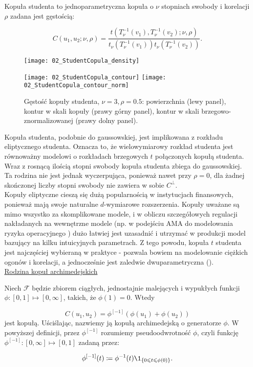 \begin{df}
	Kopuła studenta to jednoparametryczna kopuła o $\nu$ stopniach swobody i korelacji $\rho$ zadana jest gęstością:
	
	$$ C(u_1, u_2;\nu,\rho) = \frac{t(T_{\nu}^{-1}(v_1), T_{\nu}^{-1}(v_2);\nu,\rho)}{t_{\nu}(T_{\nu}^{-1}(v_1))t_{\nu}(T_{\nu}^{-1}(v_2))}.$$
\end{df}
\begin{figure}[h]
	\centering
	\begin{minipage}{0.5\linewidth}
		\texttt{[image: 02\_StudentCopula\_density]}
	\end{minipage}
	\begin{minipage}{0.45\linewidth}
		\texttt{[image: 02\_StudentCopula\_contour]}
		\texttt{[image: 02\_StudentCopula\_contour\_norm]}
	\end{minipage}
	\caption{Gęstość kopuły studenta, $\nu=3, \rho=0.5$: powierzchnia (lewy panel), kontur w skali kopuły (prawy górny panel), kontur w skali brzegowo-znormalizowanej (prawy dolny panel). \label{fig:student_copula_density}}
\end{figure}
Kopuła studenta, podobnie do gaussowskiej, jest implikowana z rozkładu eliptycznego studenta. Oznacza to, że wielowymiarowy rozkład studenta jest równoważny modelowi o rozkładach brzegowych $t$ połączonych kopułą studenta. Wraz z rosnącą ilością stopni swobody kopuła studenta zbiega do gaussowskiej. Ta rodzina nie jest jednak wyczerpująca, ponieważ nawet przy $\rho=0$, dla żadnej skończonej liczby stopni swobody nie zawiera w sobie $C^{\perp}$.\\

Kopuły eliptyczne cieszą się dużą popularnością w instytucjach finansowych, ponieważ mają swoje naturalne $d$-wymiarowe rozszerzenia. Kopuły uważane są mimo wszystko za skomplikowane modele, i w obliczu szczegółowych regulacji nakładanych na wewnętrzne modele (np. w podejściu AMA do modelowania ryzyka operacyjnego \cite{BaselII}) dużo łatwiej jest uzasadnić i utrzymać w produkcji model bazujący na kilku intuicyjnych parametrach. Z tego powodu, kopuła $t$ studenta jest najczęściej wybieraną w praktyce - pozwala bowiem na modelowanie ciężkich ogonów i korelacji, a jednocześnie jest zaledwie dwuparametryczna (\cite{OpRisk}).\\

\underline{Rodzina kopuł archimedejskich}
\vspace{0.5cm}
\begin{df}
		Niech $\mathcal{F}$ będzie zbiorem ciągłych, jednostajnie malejących i wypukłych funkcji $\phi \colon [0,1] \mapsto [0, \infty]$, takich, że $\phi(1) = 0$. Wtedy
		
		$$ C(u_1, u_2) = \phi^{[-1]}(\phi(u_1)+\phi(u_2))$$
		jest kopułą. Uściślając, nazwiemy ją kopułą archimedejską o generatorze $\phi$. W powyższej definicji, przez $\phi^{[-1]}$ rozumiemy pseudoodwrotność $\phi$, czyli funkcję $\phi^{[-1]}\colon [0, \infty] \mapsto [0, 1]$ zadaną przez:
		
		$$ \phi^{[-1]}(t) \coloneqq \phi^{-1}(t) \1_{\{0\leqslant t \leqslant \phi(0)\}}. $$
\end{df}

